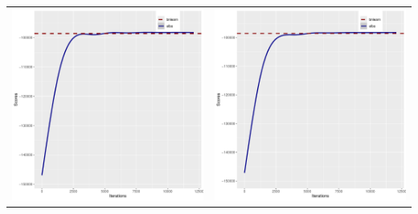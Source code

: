 \documentclass[]{scrartcl}
\begin{document}
\begin{tabular}{cc}
\includegraphics[scale = 0.4]{./figs/hepar2/mapEvolution-1-12077.pdf} &
\includegraphics[scale = 0.4]{./figs/hepar2/mapEvolution-2-12077.pdf} \\
\end{tabular}
\end{document}
